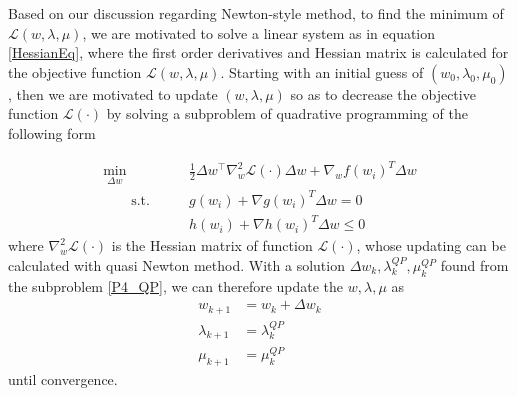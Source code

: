 



Based on our discussion regarding Newton-style method, to find the minimum of $	\mathcal{L}(w,\lambda, \mu) $, we are motivated to solve a linear system as in equation \ref{HessianEq}, where the first order derivatives and Hessian matrix is calculated for the objective function $\mathcal{L}(w,\lambda, \mu)$. Starting with an initial guess of $(w_0, \lambda_0, \mu_0)$, then we are motivated to update  $(w,\lambda, \mu)$ so as to decrease the objective function $\mathcal{L}(\cdot)$ by solving a subproblem of quadrative programming of the following form


\begin{subequations}
	\label{eq:ocp_QP}
	\begin{align}
		\underset{\Delta w }{\text{min}} \qquad & \frac{1}{2} \Delta w^\top \nabla^2_w \mathcal{L}(\cdot)\Delta w +\nabla_w f(w_i)^T \Delta w	\\
		\qquad \text{s.t.}\qquad	& g(w_i) + \nabla g(w_i)^T \Delta w = 0 \\
		& h(w_i) + \nabla h(w_i)^T \Delta w \leq 0
	\end{align}
	\label{P4_QP}
\end{subequations}
where $\nabla^2_w \mathcal{L}(\cdot)$ is the Hessian matrix of function $\mathcal{L}(\cdot)$, whose updating can be calculated with quasi Newton method. With a solution $\Delta w_k, \lambda_k^{QP}, \mu_k^{QP}$ found from the subproblem \ref{P4_QP}, we can therefore update the $w, \lambda, \mu$ as 
\begin{subequations}
	\begin{align}
		w_{k+1} &= w_k + \Delta w_k \\
		\lambda_{k+1} &= \lambda_k^{QP} \\ 
		\mu_{k+1}&= \mu_k^{QP} 
	\end{align}
\end{subequations}
until convergence. 

